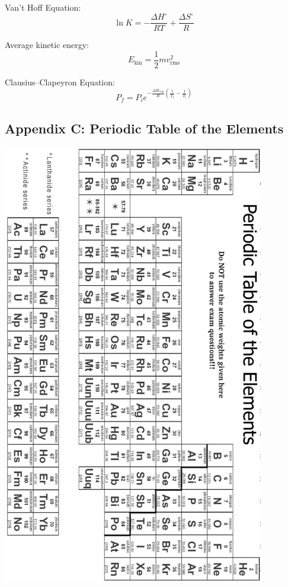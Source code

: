 \documentclass[11pt]{article}
\begin{document}
Van't Hoff Equation:
\begin{equation*}
  \ln K = -\frac{\Delta H^\circ}{RT} + \frac{\Delta S^\circ}{R}
\end{equation*}

Average kinetic energy:
\begin{equation*}
  E_{\text{kin}} = \frac{1}{2} m v_{\text{rms}}^2
\end{equation*}

Clausius--Clapeyron Equation:
\begin{equation*}
  P_f = P_ie^{-\frac{\Delta H_\text{vap}}{R}(\frac{1}{T_f} - \frac{1}{T_i})}
\end{equation*}

\clearpage

\subsection*{Appendix C: Periodic Table of the Elements}

\begin{center}
\includegraphics[width=4.5in]{pte.png}
\end{center}
\end{document}
